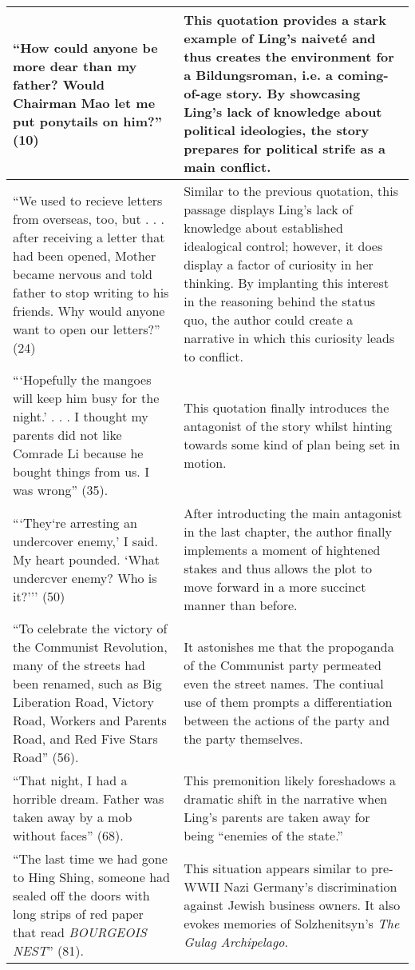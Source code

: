\documentclass[12pt]{article}
\begin{document}
\begin{tabularx}{\textwidth}{ |X|X| }
  \hline
  ``How could anyone be more dear than my father? Would Chairman Mao let me put ponytails on him?'' (10) & This quotation provides a stark example of Ling's naiveté and thus creates the environment for a Bildungsroman, i.e. a coming-of-age story. By showcasing Ling's lack of knowledge about political ideologies, the story prepares for political strife as a main conflict.  \\
  \hline
  ``We used to recieve letters from overseas, too, but . . . after receiving a letter that had been opened, Mother became nervous and told father to stop writing to his friends. Why would anyone want to open our letters?'' (24) & Similar to the previous quotation, this passage displays Ling's lack of knowledge about established idealogical control; however, it does display a factor of curiosity in her thinking. By implanting this interest in the reasoning behind the status quo, the author could create a narrative in which this curiosity leads to conflict.  \\
  \hline
  ```Hopefully the mangoes will keep him busy for the night.' . . . I thought my parents did not like Comrade Li because he bought things from us. I was wrong'' (35). & This quotation finally introduces the antagonist of the story whilst hinting towards some kind of plan being set in motion. \\
  \hline
  ```They`re arresting an undercover enemy,' I said. My heart pounded. `What undercver enemy? Who is it?''' (50) & After introducting the main antagonist in the last chapter, the author finally implements a moment of hightened stakes and thus allows the plot to move forward in a more succinct manner than before. \\
  \hline
  ``To celebrate the victory of the Communist Revolution, many of the streets had been renamed, such as Big Liberation Road, Victory Road, Workers and Parents Road, and Red Five Stars Road'' (56). & It astonishes me that the propoganda of the Communist party permeated even the street names. The contiual use of them prompts a differentiation between the actions of the party and the party themselves. \\
  \hline
  ``That night, I had a horrible dream. Father was taken away by a mob without faces'' (68). & This premonition likely foreshadows a dramatic shift in the narrative when Ling's parents are taken away for being ``enemies of the state.'' \\
  \hline
  ``The last time we had gone to Hing Shing, someone had sealed off the doors with long strips of red paper that read \emph{BOURGEOIS NEST}'' (81). & This situation appears similar to pre-WWII Nazi Germany's discrimination against Jewish business owners. It also evokes memories of Solzhenitsyn's \emph{The Gulag Archipelago}. \\

\end{tabularx}
\end{document}
